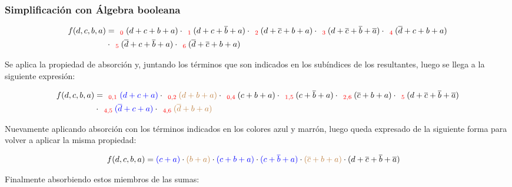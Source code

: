\subsubsection{Simplificación con Álgebra booleana}

\begin{equation*}
\begin{align*}
f(d,c,b,a) & = _{\ \ \color{red} 0} {(d+c+b+a)}
\cdot _{\ \ \color{red} 1} {(d+c+\overline{b}+a)}
\cdot _{\ \ \color{red} 2} {(d+\overline{c}+b+a)}
\cdot _{\ \ \color{red} 3} {(d+\overline{c}+\overline{b}+\overline{a})}
\cdot _{\ \ \color{red} 4} {(\overline{d}+c+b+a)} \\
& \cdot _{\ \ \color{red} 5} {(\overline{d}+c+\overline{b}+a)}
\cdot _{\ \ \color{red} 6} {(\overline{d}+\overline{c}+b+a)}
\end{align*}
\end{equation*}

Se aplica la propiedad de absorci\'on y, juntando los t\'erminos que son indicados en los sub\'indices de los 
resultantes, luego se llega a la siguiente expresi\'on:

\begin{equation*}
\begin{align*}
f(d,c,b,a) & = _{\ \ \color{red} 0,1} {\color{blue} (d+c+a)}
\cdot _{\ \ \color{red} 0,2} {\color{brown} (d+b+a)}
\cdot _{\ \ \color{red} 0,4} {(c+b+a)}
\cdot _{\ \ \color{red} 1,5} {(c+\overline{b}+a)}
\cdot _{\ \ \color{red} 2,6} {(\overline{c}+b+a)}
\cdot _{\ \ \color{red} 5} {(d+\overline{c}+\overline{b}+\overline{a})} \\
& \cdot _{\ \ \color{red} 4,5} {\color{blue} (\overline{d}+c+a)}
\cdot _{\ \ \color{red} 4,6} {\color{brown} (\overline{d}+b+a)}
\end{align*}
\end{equation*}

Nuevamente aplicando absorci\'on con los t\'erminos indicados en los colores azul y marr\'on,
luego queda expresado de la siguiente forma para volver a aplicar la misma propiedad:

\begin{equation*}
\begin{align*}
f(d,c,b,a) & = {\color{blue} (c+a)}
\cdot {\color{brown} (b+a)}
\cdot {\color{blue} (c+b+a)}
\cdot {\color{blue} (c+\overline{b}+a)}
\cdot {\color{brown} (\overline{c}+b+a)}
\cdot {(d+\overline{c}+\overline{b}+\overline{a})} 
\end{align*}
\end{equation*}

Finalmente absorbiendo estos miembros de las sumas:

